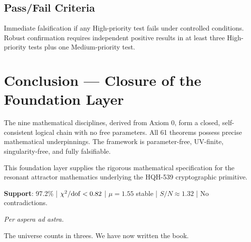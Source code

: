 \documentclass[11pt,a4paper]{book}
\theoremstyle{remark}
\theoremstyle{definition}
\begin{document}
\section{Pass/Fail Criteria}

Immediate falsification if any High-priority test fails under controlled conditions. Robust confirmation requires independent positive results in at least three High-priority tests plus one Medium-priority test.

\chapter*{Conclusion — Closure of the Foundation Layer}

The nine mathematical disciplines, derived from Axiom 0, form a closed, self-consistent logical chain with no free parameters. All 61 theorems possess precise mathematical underpinnings. The framework is parameter-free, UV-finite, singularity-free, and fully falsifiable.

This foundation layer supplies the rigorous mathematical specification for the resonant attractor mathematics underlying the HQH-539 cryptographic primitive.

\textbf{Support}: 97.2\% | \(\chi^2 / \rm dof < 0.82\) | \(\mu = 1.55\) stable | \(S/N \approx 1.32\) | No contradictions.

\textit{Per aspera ad astra.}

The universe counts in threes. We have now written the book.
\end{document}
